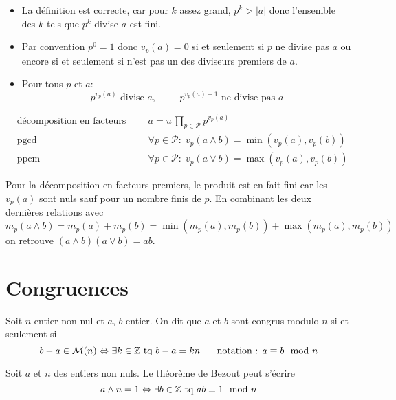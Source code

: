 \begin{rems}
\begin{itemize}
  \item La définition est correcte, car pour $k$ assez grand, $p^k >|a|$ donc l'ensemble des $k$ tels que $p^k$ divise $a$ est fini.
  \item Par convention $p^0=1$ donc $v_p(a)=0$ si et seulement si $p$ ne divise pas $a$ ou encore si et seulement si n'est pas un des diviseurs premiers de $a$.
  \item Pour tous $p$ et $a$:
\begin{displaymath}
  p^{v_p(a)}\text{ divise } a,\hspace{1cm} p^{v_p(a)+1}\text{ ne divise pas } a
\end{displaymath}
\end{itemize}
\end{rems}
\begin{prop}
\begin{align*}
  &\text{décomposition en facteurs premiers:}& a= u\,\prod_{p\in \mathcal P}p^{v_p(a)}\\
  &\text{pgcd}&\forall p\in \mathcal P :\; v_p(a\wedge b) = \min(v_p(a),v_p(b))\\
  &\text{ppcm}&\forall p\in \mathcal P :\; v_p(a\vee b)=\max(v_p(a),v_p(b))
\end{align*}
\end{prop}
\begin{rem}
Pour la décomposition en facteurs premiers, le produit est en fait fini car les $v_p(a)$ sont nuls sauf pour un nombre finis de $p$.\newline
En combinant les deux dernières relations avec 
\begin{displaymath}
m_p(a\wedge b)=m_p(a)+m_p(b)= \min(m_p(a),m_p(b))+ \max(m_p(a),m_p(b))
\end{displaymath}
on retrouve $(a\wedge b)(a\vee b)=ab$.
\end{rem}

\section{Congruences}
\begin{defi}
  Soit $n$ entier non nul et $a$, $b$ entier. On dit que $a$ et $b$ sont congrus modulo $n$ si et seulement si
\begin{displaymath}
  b-a \in \mathcal{M}(n) \Leftrightarrow \exists k\in\mathbb{Z} \text{ tq } b - a = kn \hspace{0.5cm} \text{ notation : } a \equiv b \mod n
\end{displaymath}
\end{defi}
\begin{rem}
  Soit $a$ et $n$ des entiers non nuls. Le théorème de Bezout peut s'écrire
\begin{displaymath}
  a \wedge n = 1 \Leftrightarrow \exists b \in \mathbb{Z} \text{ tq } ab \equiv 1 \mod n
\end{displaymath}
\end{rem}

